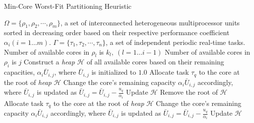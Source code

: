 \documentclass[conference]{IEEEtran}
\begin{document}
\begin{algorithm} 
\caption{Min-Core Worst-Fit Partitioning Heuristic} \label{algo:mw}
\footnotesize
\begin{algorithmic}[1]
\REQUIRE $\Omega = \{\rho_1, \rho_2,\cdots, \rho_m\}$, a set of interconnected heterogeneous multiprocessor units 
 sorted in decreasing order based on their respective performance coefficient $\alpha_i (i=1\ldots m)$.
 $\Gamma = \{\tau_1, \tau_2, \cdots, \tau_n\}$, a set of independent periodic real-time tasks.
 \label{for1}
	\STATE Number of available cores in $\rho_l$ is $k_l, ~ (l=1 \ldots i-1)$
	 \label{for2}
		\STATE Number of available cores in $\rho_i$ is $j$
		\STATE Construct a \emph{heap} $\mathcal{H}$ of all available cores based on their remaining capacities, $\alpha_i \bar{U}_{i,j}$, where $\bar{U}_{i,j}$ is initialized to $1.0$ \label{heap}
		 \label{worst-start}
			 \label{allocation}
				\STATE Allocate task $\tau_q$ to the core at the root of  \emph{heap} $\mathcal{H}$ 
\STATE Change the core's remaining capacity $\alpha_i \bar{U}_{i,j}$ accordingly, where $\bar{U}_{i,j}$ is updated as $\bar{U}_{i,j} = \bar{U}_{i,j} - \frac{u_q}{\alpha_i}$
				\STATE \label{end-allo} Update  $\mathcal{H}$ 
			\ELSE
				\STATE Remove the root of  $\mathcal{H}$ \label{inner-if}
				 \label{while}
					\STATE Allocate task $\tau_q$ to the core at the root of  \emph{heap} $\mathcal{H}$ 
\STATE Change the core's remaining capacity $\alpha_i \bar{U}_{i,j}$ accordingly, where $\bar{U}_{i,j}$ is updated as $\bar{U}_{i,j} = \bar{U}_{i,j} - \frac{u_q}{\alpha_i}$
				\STATE \label{end-allo1} Update  $\mathcal{H}$ 


\end{algorithmic}
\end{algorithm}
\end{document}
